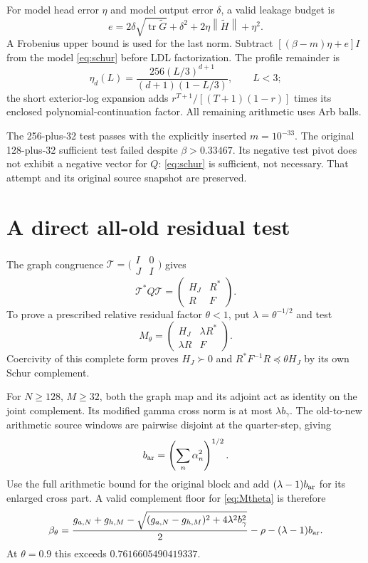\documentclass[11pt]{article}
\theoremstyle{remark}\newtheorem{remark}[theorem]{Remark}
\newcommand{\norm}[1]{\left\|#1\right\|}
\begin{document}
For model head error $\eta$ and model output error $\delta$, a valid leakage budget is
\begin{equation}\label{eq:error}
 e=2\delta\sqrt{\operatorname{tr}\widetilde G}+\delta^2
 +2\eta\norm{\widetilde H}+\eta^2.
\end{equation}
A Frobenius upper bound is used for the last norm. Subtract $[(\beta-m)\eta+e]I$ from the model \eqref{eq:schur} before LDL factorization. The profile remainder is
\[
 \eta_d(L)=\frac{256(L/3)^{d+1}}{(d+1)(1-L/3)},\qquad L<3;
\]
the short exterior-log expansion adds $r^{T+1}/[(T+1)(1-r)]$ times its enclosed polynomial-continuation factor. All remaining arithmetic uses Arb balls.

The 256-plus-32 test passes with the explicitly inserted $m=10^{-33}$. The original 128-plus-32 sufficient test failed despite $\beta>0.33467$. Its negative test pivot does not exhibit a negative vector for $Q$: \eqref{eq:schur} is sufficient, not necessary. That attempt and its original source snapshot are preserved.

\section{A direct all-old residual test}\label{sec:direct}

The graph congruence $\mathcal T=\bigl(\begin{smallmatrix}I&0\\J&I\end{smallmatrix}\bigr)$ gives
\[
 \mathcal T^*Q\mathcal T=\begin{pmatrix}H_J&R^*\\R&F\end{pmatrix}.
\]
To prove a prescribed relative residual factor $\theta<1$, put $\lambda=\theta^{-1/2}$ and test
\begin{equation}\label{eq:Mtheta}
 M_\theta=\begin{pmatrix}H_J&\lambda R^*\\\lambda R&F\end{pmatrix}.
\end{equation}
Coercivity of this complete form proves $H_J\succ0$ and $R^*F^{-1}R\preceq\theta H_J$ by its own Schur complement.

For $N\ge128$, $M\ge32$, both the graph map and its adjoint act as identity on the joint complement. Its modified gamma cross norm is at most $\lambda b_\gamma$. The old-to-new arithmetic source windows are pairwise disjoint at the quarter-step, giving
\[
 b_{\rm ar}=\left(\sum_n\alpha_n^2\right)^{1/2}.
\]
Use the full arithmetic bound for the original block and add $(\lambda-1)b_{\rm ar}$ for its enlarged cross part. A valid complement floor for \eqref{eq:Mtheta} is therefore
\begin{equation}\label{eq:betatheta}
 \beta_\theta=\frac{g_{a,N}+g_{h,M}-\sqrt{(g_{a,N}-g_{h,M})^2+4\lambda^2b_\gamma^2}}2
 -\rho-(\lambda-1)b_{\rm ar}.
\end{equation}
At $\theta=0.9$ this exceeds $0.7616605490419337$.
\end{document}
